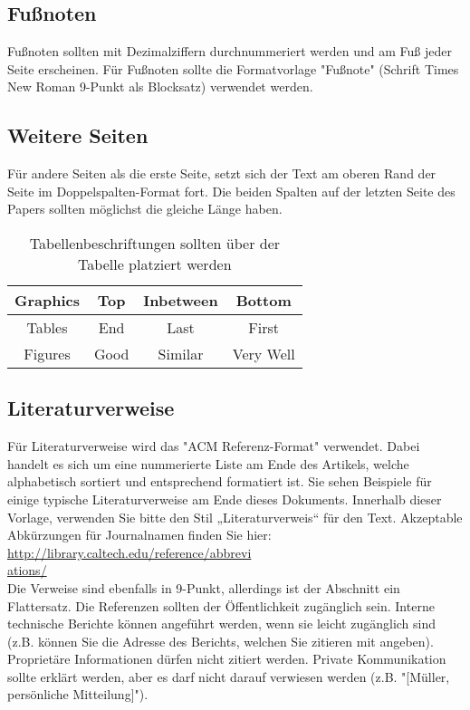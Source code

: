 {\subsection{Fußnoten}
Fußnoten sollten mit Dezimalziffern durchnummeriert werden und am Fuß jeder Seite erscheinen. Für Fußnoten sollte die Formatvorlage "Fußnote" (Schrift Times New Roman 9-Punkt als Blocksatz) verwendet werden.

\subsection{Weitere Seiten}
Für andere Seiten als die erste Seite, setzt sich der Text am oberen Rand der Seite im Doppelspalten-Format fort. Die beiden Spalten auf der letzten Seite des Papers sollten möglichst die gleiche Länge haben.

\begin{table}
\centering
\caption{Tabellenbeschriftungen sollten über der Tabelle platziert werden}
\begin{tabular}{|@{}c@{}|c|c|c|} \hline
Graphics&Top&Inbetween&Bottom\\ \hline
Tables & End& Last& First\\ \hline
Figures & Good& Similar& Very Well\\ \hline
\end{tabular}
\end{table}

\subsection{Literaturverweise}
Für Literaturverweise wird das "ACM Referenz-Format" verwendet. Dabei handelt es sich um eine nummerierte Liste am Ende des Artikels, welche alphabetisch sortiert und entsprechend formatiert ist. Sie sehen Beispiele für einige typische Literaturverweise am Ende dieses Dokuments. Innerhalb dieser Vorlage, verwenden Sie bitte den Stil „Literaturverweis“ für den Text. Akzeptable Abkürzungen für Journalnamen finden Sie hier:\\
\href{URL}{http://library.caltech.edu/reference/abbrevi\\ations/}\\
Die Verweise sind ebenfalls in 9-Punkt, allerdings ist der Abschnitt ein Flattersatz. Die Referenzen sollten der Öffentlichkeit zugänglich sein. Interne technische Berichte können angeführt werden, wenn sie leicht zugänglich sind (z.B. können Sie die Adresse des Berichts, welchen Sie zitieren mit angeben). Proprietäre Informationen dürfen nicht zitiert werden. Private Kommunikation sollte erklärt werden, aber es darf nicht darauf verwiesen werden (z.B. "[Müller, persönliche Mitteilung]").

}
